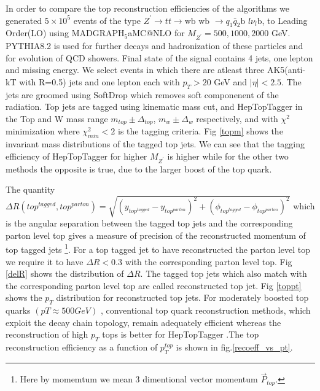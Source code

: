 \documentclass[12pt,a4paper]{article}		%
\begin{document}
In order to compare the top reconstruction efficiencies of the algorithms we generated $5 \times 10^5$ events of the type  $Z^\prime \to t t \to \text{wb wb } \to q_1 \bar{q}_2\text{b }l \nu_l\text{b}$, to Leading Order(LO) using $\text{MADGRAPH}_5$aMC@NLO \cite{mad1,mad2} for $M_{Z^\prime} = 500,1000,2000$ GeV. PYTHIA8.2 \cite{pythia} is used for further decays and hadronization  of these particles and for evolution of QCD showers. Final state of the signal contains 4 jets, one lepton and missing energy. We select events in which there are atleast three AK5(anti-kT with R=0.5) jets and one lepton each with $p_T > 20$ GeV and $|\eta| < 2.5$. The jets are groomed using SoftDrop\cite{softdrop} which removes soft componenent of the radiation. Top jets are tagged using kinematic mass cut, and HepTopTagger in the Top and W mass range $m_{top} \pm \Delta_{top}$, $m_{w} \pm \Delta_{w}$ respectively, and with $\chi^2$ minimization where $\chi_{min}^2 < 2$ is the tagging criteria. Fig \ref{topm} shows the invariant mass distributions of the tagged top jets. We can see that the tagging efficiency of HepTopTagger for higher $M_{Z^\prime}$ is higher while for the other two methods the opposite is true, due to the larger boost of the top quark.\\
\linebreak

The quantity $\Delta R( top^{tagged}, top^{parton} ) =  \sqrt{ \left(  y_{top^{tagged}} - y_{top^{parton}} \right) ^2 +  \left( \phi_{top^{tagged}} - \phi_{top^{parton}} \right) ^2 }$ which is the angular separation between the tagged top jets and the corresponding parton level top gives a measure of precision of the reconstructed momentum of top tagged jets \footnote{Here by momemtum we mean 3 dimentional vector momentum $\vec{P}_{top}$.  }. For a top tagged jet to have reconstructed the parton level top we require it to have $\Delta R < 0.3$ with the corresponding parton level top. Fig \ref{delR} shows the distribution of $\Delta R$. The tagged top jets which also match with the corresponding parton level top are called reconstructed top jet. Fig \ref{toppt} shows the $p_T$ distribution for reconstructed top jets. For moderately boosted top quarks $(pT \approx 500 GeV)$ , conventional top quark reconstruction methods, which exploit the decay chain topology, remain adequately efficient whereas the reconstruction of high $p_T$ tops is better for HepTopTagger .The top reconstruction efficiency as a function of $p_T^{top}$ is shown in fig.\ref{recoeff_vs_pt}.       
 
\end{document}
